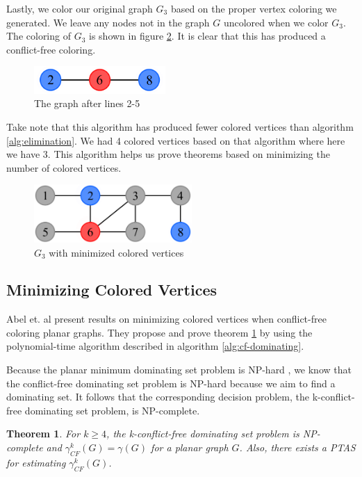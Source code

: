 \documentclass{sig-alternate}
\newtheorem{theorem}{Theorem}
\begin{document}
Lastly, we color our original graph $G_3$ based on the proper vertex coloring we generated. We leave any nodes not in the graph $G$ uncolored when we color $G_3$. The coloring of $G_3$ is shown in figure \ref{fig:algorithm2-step4}. It is clear that this has produced a conflict-free coloring.

\begin{figure}[h]
	\centering
	\includegraphics[width=5cm]{../figures/algorithm2-step3.pdf}
	\caption{The graph after lines 2-5}\label{fig:algorithm2-step3}
\end{figure}

Take note that this algorithm has produced fewer colored vertices than algorithm \ref{alg:elimination}. We had 4 colored vertices based on that algorithm where here we have 3. This algorithm helps us prove theorems based on minimizing the number of colored vertices.

\begin{figure}[h]
	\centering
	\includegraphics[width=6cm]{../figures/algorithm2-step4.pdf}
	\caption{$G_3$ with minimized colored vertices}\label{fig:algorithm2-step4}
\end{figure}

\subsection{Minimizing Colored Vertices}
Abel et. al \cite{abel2017three} present results on minimizing colored vertices when conflict-free coloring planar graphs. They propose and prove theorem \ref{thm:approximate-cfds} by using the polynomial-time algorithm described in algorithm \ref{alg:cf-dominating}.

Because the planar minimum dominating set problem is NP-hard \cite{garey2002computers}, we know that the conflict-free dominating set problem is NP-hard because we aim to find a dominating set. It follows that the corresponding decision problem, the k-conflict-free dominating set problem, is NP-complete.

\begin{theorem} \label{thm:approximate-cfds}
For $k \geq 4$, the k-conflict-free dominating set problem is NP-complete and $\gamma_{CF}^k(G) = \gamma(G)$ for a planar graph $G$. Also, there exists a PTAS for estimating $\gamma_{CF}^k(G)$.
\end{theorem}
\end{document}
